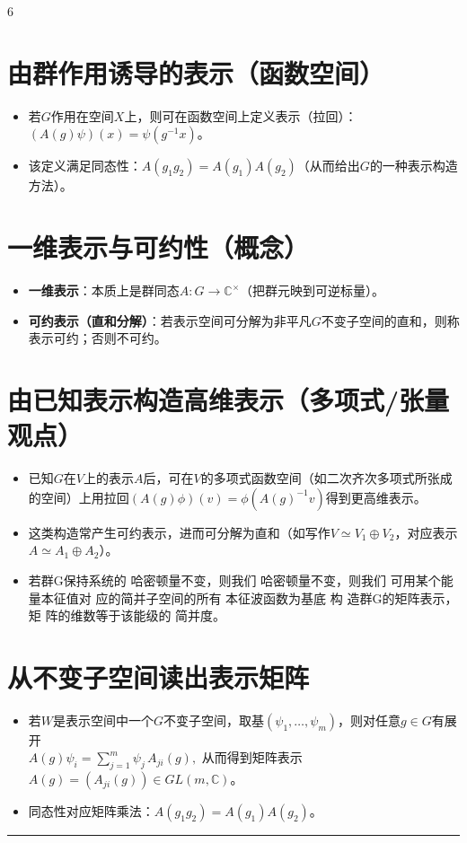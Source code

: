 \documentclass[landscape]{article}
\begin{document}
\begin{multicols*}{6}
\section*{由群作用诱导的表示（函数空间）}
\begin{itemize}
  \item 若$G$作用在空间$X$上，则可在函数空间上定义表示（拉回）：$(A(g)\psi)(x)=\psi(g^{-1}x)$。
  \item 该定义满足同态性：$A(g_1g_2)=A(g_1)A(g_2)$（从而给出$G$的一种表示构造方法）。
\end{itemize}

\section*{一维表示与可约性（概念）}
\begin{itemize}
  \item \textbf{一维表示}：本质上是群同态$A:G\to \mathbb{C}^{\times}$（把群元映到可逆标量）。
  \item \textbf{可约表示（直和分解）}：若表示空间可分解为非平凡$G$不变子空间的直和，则称表示可约；否则不可约。
\end{itemize}

\section*{由已知表示构造高维表示（多项式/张量观点）}
\begin{itemize}
  \item 已知$G$在$V$上的表示$A$后，可在$V$的多项式函数空间（如二次齐次多项式所张成的空间）上用拉回$(A(g)\phi)(v)=\phi(A(g)^{-1}v)$得到更高维表示。
  \item 这类构造常产生可约表示，进而可分解为直和（如写作$V\simeq V_1\oplus V_2$，对应表示$A\simeq A_1\oplus A_2$）。
  \item 若群G保持系统的
  哈密顿量不变，则我们
  哈密顿量不变，则我们
  可用某个能量本征值对
  应的简并子空间的所有
  本征波函数为基底 构
  造群G的矩阵表示，矩
  阵的维数等于该能级的
  简并度。
\end{itemize}

\section*{从不变子空间读出表示矩阵}
\begin{itemize}
  \item 若$W$是表示空间中一个$G$不变子空间，取基$(\psi_1,\dots,\psi_m)$，则对任意$g\in G$有展开
  \\
  $
  A(g)\psi_i=\sum_{j=1}^m \psi_j\,A_{ji}(g),
  $
  从而得到矩阵表示$A(g)=(A_{ji}(g))\in GL(m,\mathbb{C})$。
  \item 同态性对应矩阵乘法：$A(g_1g_2)=A(g_1)A(g_2)$。
\end{itemize}
\noindent\textcolor{red}{\rule{\linewidth}{1pt}}

\end{multicols*}
\end{document}
